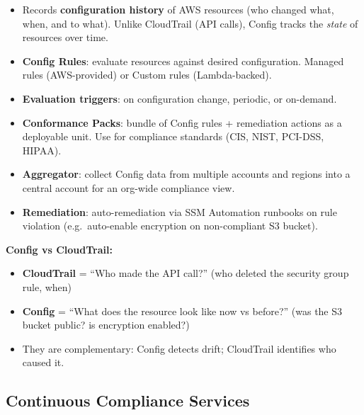 

\begin{keyfacts}
\begin{itemize}
  \item Records \textbf{configuration history} of AWS resources (who changed what, when, and to what).
        Unlike CloudTrail (API calls), Config tracks the \emph{state} of resources over time.
  \item \textbf{Config Rules}: evaluate resources against desired configuration.
        Managed rules (AWS-provided) or Custom rules (Lambda-backed).
  \item \textbf{Evaluation triggers}: on configuration change, periodic, or on-demand.
  \item \textbf{Conformance Packs}: bundle of Config rules + remediation actions as a deployable unit.
        Use for compliance standards (CIS, NIST, PCI-DSS, HIPAA).
  \item \textbf{Aggregator}: collect Config data from multiple accounts and regions into a central
        account for an org-wide compliance view.
  \item \textbf{Remediation}: auto-remediation via SSM Automation runbooks on rule violation
        (e.g.\ auto-enable encryption on non-compliant S3 bucket).
\end{itemize}
\end{keyfacts}

\begin{examtip}
\textbf{Config vs CloudTrail:}
\begin{itemize}
  \item \textbf{CloudTrail} = ``Who made the API call?'' (who deleted the security group rule, when)
  \item \textbf{Config} = ``What does the resource look like now vs before?'' (was the S3 bucket public? is encryption enabled?)
  \item They are complementary: Config detects drift; CloudTrail identifies who caused it.
\end{itemize}
\end{examtip}

\subsection{Continuous Compliance Services}

